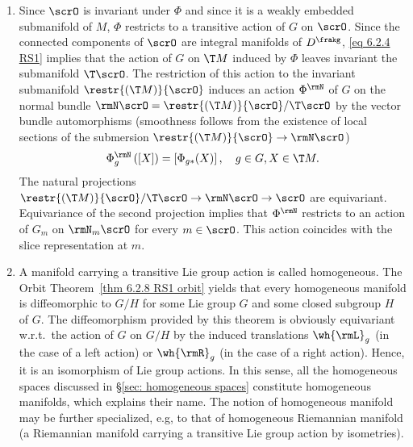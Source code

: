 \begin{rem}[{{\cite[Rem.~6.2.10]{RS1}}}]
\begin{enumerate}
        On the other hand, the isotropy representation restricted to $\T_m\scrO$ can be brought to the following normal form. By the Orbit Theorem~\ref{thm 6.2.8 RS1 orbit}, the map $\Phi^m_{\ast e}:\frakg\to \T_mM$ has image $\T_m\scrO$. By point 3 of Proposition~\ref{prop 6.2.2 RS1} it has kernel $\frakg_m$. Hence, this mapping induces a natural vector space isomorphism
        \[\T_m\scrO\cong \frakg\slash\frakg_m.\]
        In view of \eqref{eq 6.2.1 RS1}, this implies that this isomorphism intertwines the representation of $G_m$ on $\frakg\slash\frakg_m$ induced by the adjoint representation with the isotropy representation on $\T_m\scrO$.
        \item Since $\scrO$ is invariant under $\Phi$ and since it is a weakly embedded submanifold of $M$, $\Phi$ restricts to a transitive action of $G$ on $\scrO$. Since the connected components of $\scrO$ are integral manifolds of $D^\frakg$, \eqref{eq 6.2.4 RS1} implies that the action of $G$ on $\T M$ induced by $\Phi$ leaves invariant the submanifold $\T \scrO$. The restriction of this action to the invariant submanifold $\restr{(\T M)}{\scrO}$ induces an action $\Phi^\rmN$ of $G$ on the normal bundle $\rmN \scrO=\restr{(\T M)}{\scrO}\slash \T \scrO$ by the vector bundle automorphisms (smoothness follows from the existence of local sections of the submersion $\restr{(\T M)}{\scrO}\to \rmN \scrO$)
        \[\Phi_g^\rmN\left([X]\right)=\left[\Phi_{g\ast}(X)\right],\quad g\in G,X\in \T M.\]
        The natural projections $\restr{(\T M)}{\scrO}\slash \T \scrO\to \rmN \scrO\to \scrO$ are equivariant. Equivariance of the second projection implies that $\Phi^\rmN$ restricts to an action of $G_m$ on $\rmN_m\scrO$ for every $m\in \scrO$. This action coincides with the slice representation at $m$.
        \item A manifold carrying a transitive Lie group action is called homogeneous. The Orbit Theorem~\ref{thm 6.2.8 RS1 orbit} yields that every homogeneous manifold is diffeomorphic to $G\slash H$ for some Lie group $G$ and some closed subgroup $H$ of $G$. The diffeomorphism provided by this theorem is obviously equivariant w.r.t.\ the action of $G$ on $G\slash H$ by the induced translations $\wh{\rmL}_g$ (in the case of a left action) or $\wh{\rmR}_g$ (in the case of a right action). Hence, it is an isomorphism of Lie group actions. In this sense, all the homogeneous spaces discussed in \S\ref{sec: homogeneous spaces} constitute homogeneous manifolds, which explains their name. The notion of homogeneous manifold may be further specialized, e.g, to that of homogeneous Riemannian manifold (a Riemannian manifold carrying a transitive Lie group action by isometries).
    \end{enumerate}
\end{rem}


